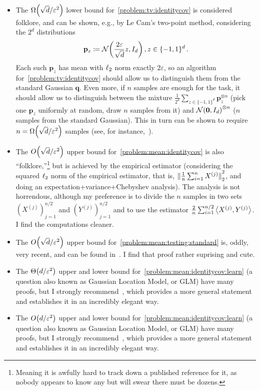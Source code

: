 \documentclass[10pt]{article}
\newcommand{\dst}{\varepsilon}
\newcommand{\ns}{n}
\newcommand{\dims}{d}
\newcommand{\p}{\mathbf{p}}
\newcommand{\q}{\mathbf{q}}
\renewcommand{\eqdef}{\coloneqq}
\theoremstyle{plain}
\begin{document}
\begin{itemize}
  \item 
The $\bigOmega{\sqrt{\dims}/\dst^2}$ lower bound for~\autoref{problem:tv:identitycov} is considered folklore, and can be shown, e.g., by Le Cam's two-point method, considering the $2^\dims$ distributions 
\[
    \p_z \eqdef \gaussian{\frac{2\dst}{\sqrt{\dims}}z}{I_\dims}, z\in\{-1,1\}^\dims\,.
\]
Each such $\p_z$ has mean with $\lp[2]$ norm exactly $2\dst$, so an algorithm for~\autoref{problem:tv:identitycov} should allow us to distinguish them from the standard Gaussian $\q$. Even more, if $\ns$ samples are enough for the task, it should allow us to distinguish between the mixture $\frac{1}{2^\dims} \sum_{z\in\{-1,1\}^\dims} \p_z^{\otimes \ns}$ (pick one $\p_z$ uniformly at random, draw $\ns$ samples from it) and $\gaussian{\mathbf{0}}{I_{\dims}}^{\otimes \ns}$ ($\ns$ samples from the standard Gaussian). This in turn can be shown to require $\ns=\bigOmega{\sqrt{\dims}/\dst^2}$ samples (see, for instance,~\cite[Chapter~23]{Wu17}).
  \item
The $\bigO{\sqrt{\dims}/\dst^2}$ upper bound for~\autoref{problem:mean:identitycov} is also ``folklore,''\footnote{Meaning it is awfully hard to track down a published reference for it, as nobody appears to know any but will swear there must be dozens.} but is achieved by the empirical estimator (considering the squared $\lp[2]$ norm of the empirical estimator, that is, $\normtwo{\frac{1}{\ns}\sum_{i=1}^\ns X^{(j)}}^2$, and doing an expectation+variance+Chebyshev analysis). The analysis is not horrendous, although my preference is to divide the $\ns$ samples in two sets $(X^{(j)})_{j=1}^{\ns/2}$ and $(Y^{(j)})_{j=1}^{\ns/2}$ and to use the estimator $\frac{2}{\ns}\sum_{i=1}^{\ns/2} \dotprod{X^{(j)}}{Y^{(j)}}$. I find the computations cleaner.
  \item
The $\bigO{\sqrt{\dims}/\dst^2}$ upper bound for~\autoref{problem:mean:testing:standard} is, oddly, very recent, and can be found in~\cite[Section~4]{CanonneCKLW19}. I find that proof rather suprising and cute.
  \item
The $\bigTheta{\dims/\dst^2}$ upper and lower bound for~\autoref{problem:mean:identitycov:learn} (a question also known as Gaussian Location Model, or GLM) have many proofs, but I strongly recommend~\cite[Section~9.1]{Wu17}, which provides a more general statement and establishes it in an incredibly elegant way.

  \item
The $\bigO{\dims/\dst^2}$ upper and lower bound for~\autoref{problem:mean:identitycov:learn} (a question also known as Gaussian Location Model, or GLM) have many proofs, but I strongly recommend~\cite[Section~9.1]{Wu17}, which provides a more general statement and establishes it in an incredibly elegant way.


\end{itemize}
\end{document}
